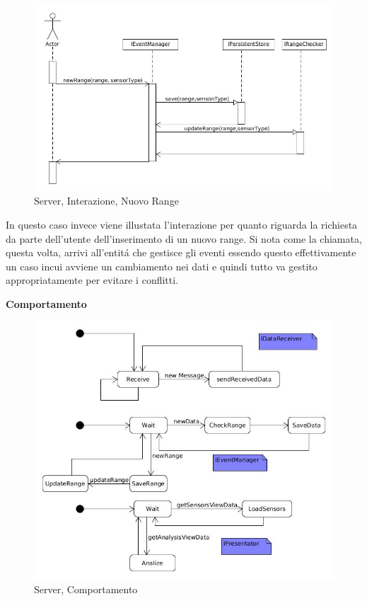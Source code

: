 \begin{figure}[h]
\centering
\includegraphics[scale=0.4]{Figures/DomainModel/Server/NewRangeInteraction}
\caption{Server, Interazione, Nuovo Range}
\end{figure}

In questo caso invece viene illustata l'interazione per quanto riguarda la richiesta da parte dell'utente dell'inserimento di un nuovo range. Si nota come la chiamata, questa volta, arrivi all'entit\'a che gestisce gli eventi essendo questo effettivamente un caso incui avviene un cambiamento nei dati e quindi tutto va gestito appropriatamente per evitare i conflitti.

\begin{center}
\textbf{Comportamento}
\end{center}

\begin{figure}[h]
\centering
\includegraphics[width=\textwidth]{Figures/DomainModel/Server/Behaviour}
\caption{Server, Comportamento}
\end{figure}


